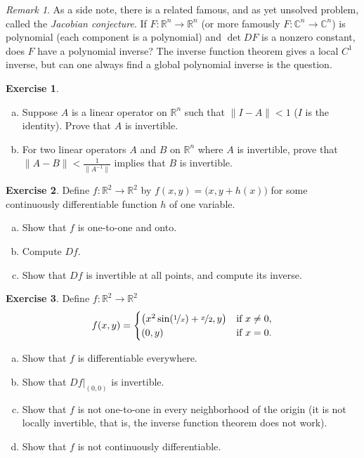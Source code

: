 \documentclass[12pt,openany]{book}
\newcommand{\snorm}[1]{\lVert {#1} \rVert}
\newcommand{\C}{{\mathbb{C}}}
\newcommand{\R}{{\mathbb{R}}}
\newcommand{\myindex}[1]{#1\index{#1}}
\theoremstyle{plain}
\theoremstyle{remark}
\newtheorem{remark}[thm]{Remark}
\theoremstyle{definition}
\newenvironment{exbox}{%
    \def\FrameCommand{\vrule width 1pt \relax\hspace{10pt}}%
    \MakeFramed{\advance\hsize-\width\FrameRestore}%
}{%
    \endMakeFramed
}
\newenvironment{exparts}{%
    \leavevmode\begin{enumerate}[a),noitemsep,topsep=0pt,parsep=0pt,partopsep=0pt]
}{%
    \end{enumerate}
}
\theoremstyle{exercise}
\newtheorem{exercise}{Exercise}[section]
\theoremstyle{example}
\begin{document}
\begin{remark}
As a side note, there is a related famous, and as yet unsolved problem,
called the \emph{\myindex{Jacobian conjecture}}.  If $F \colon \R^n \to \R^n$
(or more famously $F \colon \C^n \to \C^n$)
is polynomial (each component is a polynomial) and $\det DF$ is a nonzero
constant, does $F$ have a polynomial inverse?
The inverse function theorem gives a local $C^1$ inverse, but can one always
find a global polynomial inverse is the question.
\end{remark}

\begin{exbox}
\begin{exercise}
\begin{exparts}
\item
Suppose $A$ is a linear operator on $\R^n$ such that
$\snorm{I-A} < 1$ ($I$ is the identity). Prove that $A$ is invertible.
\item
For two linear operators $A$ and $B$ on $\R^n$ where $A$ is invertible,
prove that $\snorm{A-B} < \frac{1}{\snorm{A^{-1}}}$ implies that $B$ is
invertible.
\end{exparts}
\end{exercise}

\begin{exercise}
Define $f \colon \R^2 \to \R^2$ by $f(x,y) =
\bigl(x,y+h(x)\bigr)$ for some continuously differentiable function $h$ of one
variable.
\begin{exparts}
\item
Show that $f$ is one-to-one and onto.
\item
Compute $Df$.
\item
Show that $Df$ is invertible at all points, and compute
its inverse.
\end{exparts}
\end{exercise}

\begin{exercise}
Define $f \colon \R^2 \to \R^2$
\begin{equation*}
f(x,y) =
\begin{cases}
\bigl(x^2 \sin (\nicefrac{1}{x}) + \nicefrac{x}{2} , y \bigr) &
\text{if } x \not= 0, \\
(0,y) &
\text{if } x=0.
\end{cases}
\end{equation*}
\begin{exparts}
\item
Show that $f$ is differentiable everywhere.
\item
Show that $Df|_{(0,0)}$ is invertible.
\item
Show that $f$ is not one-to-one in every neighborhood of the origin (it is
not locally invertible, that is, the inverse function theorem does not work).
\item
Show that $f$ is not continuously differentiable.
\end{exparts}
\end{exercise}


\end{exbox}
\end{document}
